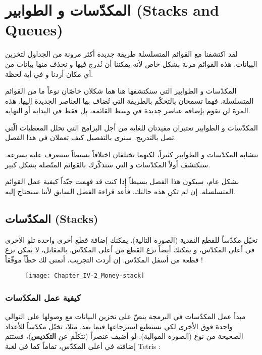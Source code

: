 \chapter{المكدّسات و الطوابير (\textenglish{Stacks and Queues})}

لقد اكتشفنا مع القوائم المتسلسلة طريقة جديدة أكثر مرونة من الجداول لتخزين البيانات. هذه القوائم مرنة بشكل خاص لأنه يمكننا أن نُدرج فيها و نحذف منها بيانات من أي مكان أردنا و في أية لحظة.

المكدّسات و الطوابير التي سنكتشفها هنا هما شكلان خاصّان نوعاً ما من القوائم المتسلسلة. فهما تسمحان بالتحكّم بالطريقة التي تُضاف بها العناصر الجديدة إليها. هذه المرة لن نقوم بإضافة عناصر جديدة في وسط القائمة، بل فقط في البداية أو النهاية. 

المكدّسات و الطوابير تعتبران مفيدتان للغاية من أجل البرامج التي تحلل المعطيات الّتي تصل بالتدريج. سنرى بالتفصيل كيف تعملان في هذا الفصل.

تتشابه المكدّسات و الطوابير كثيراً، لكنهما تختلفان اختلافاً بسيطاً ستتعرف عليه بسرعة. سنكتشف أولاً المكدّسات و التي ستذكّرك بالقوائم المتّصلة بشكل كبير. 

بشكل عام، سيكون هذا الفصل بسيطاً إذا كنت قد فهمت جيّداً كيفية عمل القوائم المتسلسلة. إن لم تكن هذه حالتك، فأعد قراءة الفصل السابق لأننا سنحتاج إليه.

\section{المكدّسات (\textenglish{Stacks})}

تخيّل مكدّساً للقطع النقدية (الصورة التالية). يمكنك إضافة قطع أخرى واحدة تلو الأخرى في أعلى المكدّس، و يمكنك أيضاً نزع القطع من أعلى المكدّس. بالمقابل، لا يمكن نزع قطعة من أسفل المكدّس. إن أردت التجريب، أتمنى لك حظًاً موفّقاً !

\begin{figure}[H]
	\centering
	\texttt{[image: Chapter\_IV-2\_Money-stack]}
\end{figure}

\subsection{كيفية عمل المكدّسات}

مبدأ عمل المكدّسات في البرمجة ينصّ على تخزين البيانات مع وصولها على التوالي واحدة فوق الأخرى لكي نستطيع استرجاعها فيما بعد. مثلا، تخيّل مكدّساً للأعداد الصحيحة من نوع 
(الصورة الموالية). لو أضيف عنصراً (نتكلّم عن
\textbf{التكديس})،
فستتم إضافته في أعلى المكدّس، تماماً كما في لعبة 
\textenglish{Tetris} :

